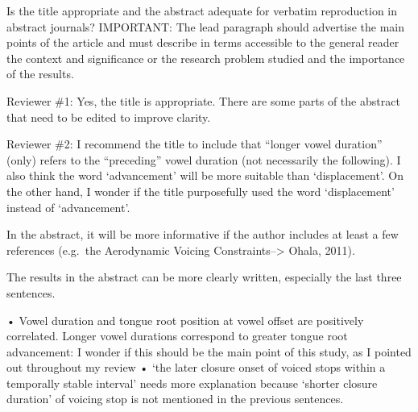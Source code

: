 \documentclass[]{article}
\begin{document}
Is the title appropriate and the abstract adequate for verbatim
reproduction in abstract journals? IMPORTANT: The lead paragraph should
advertise the main points of the article and must describe in terms
accessible to the general reader the context and significance or the
research problem studied and the importance of the results.

Reviewer \#1: Yes, the title is appropriate. There are some parts of the
abstract that need to be edited to improve clarity.

Reviewer \#2: I recommend the title to include that ``longer vowel
duration'' (only) refers to the ``preceding'' vowel duration (not
necessarily the following). I also think the word `advancement' will be
more suitable than `displacement'. On the other hand, I wonder if the
title purposefully used the word `displacement' instead of
`advancement'.

In the abstract, it will be more informative if the author includes at
least a few references (e.g.~the Aerodynamic Voicing
Constraints--\textgreater{} Ohala, 2011).

The results in the abstract can be more clearly written, especially the
last three sentences.

• Vowel duration and tongue root position at vowel offset are positively
correlated. Longer vowel durations correspond to greater tongue root
advancement: I wonder if this should be the main point of this study, as
I pointed out throughout my review • `the later closure onset of voiced
stops within a temporally stable interval' needs more explanation
because `shorter closure duration' of voicing stop is not mentioned in
the previous sentences.
\end{document}
